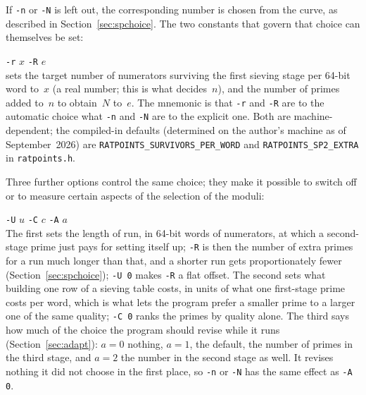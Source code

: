 \documentclass[12pt,a4paper,oneside]{amsart}
\begin{document}
If \verb+-n+ or \verb+-N+ is left out, the corresponding number is chosen
from the curve, as described in Section~\ref{sec:spchoice}. The two constants
that govern that choice can themselves be set: \\
\strut\quad\verb+-r+ $x$ \verb+-R+ $e$ \\
sets the target number of numerators surviving the first sieving stage per
64-bit word to~$x$ (a real number; this is what decides~$n$), and the number
of primes added to~$n$ to obtain~$N$ to~$e$. The mnemonic is that \verb+-r+ and
\verb+-R+ are to the automatic choice what \verb+-n+ and \verb+-N+ are to
the explicit one. Both are machine-dependent; the compiled-in defaults
(determined on the author's machine as of September~2026)
are \texttt{RATPOINTS\_SURVIVORS\_PER\_WORD}
and \texttt{RATPOINTS\_SP2\_EXTRA} in \texttt{ratpoints.h}.

Three further options control the same choice; they make it possible to
switch off or to measure certain aspects of the selection of the moduli: \\
\strut\quad\verb+-U+ $u$ \quad\verb+-C+ $c$ \quad\verb+-A+ $a$ \\
The first sets the length of run, in 64-bit words of numerators, at which a
second-stage prime just pays for setting itself up; \verb+-R+ is then the
number of extra primes for a run much longer than that, and a shorter run
gets proportionately fewer (Section~\ref{sec:spchoice}); \verb+-U 0+ makes
\verb+-R+ a flat offset. The second sets what building one row of a sieving
table costs, in units of what one first-stage prime costs per word, which
is what lets the program prefer a smaller prime to a larger one of the same
quality; \verb+-C 0+ ranks the primes by quality alone. The third says how
much of the choice the program should revise while it runs
(Section~\ref{sec:adapt}): $a = 0$ nothing, $a = 1$, the default, the
number of primes in the third stage, and $a = 2$ the number in the second
stage as well. It revises nothing it did not choose in the first place, so
\verb+-n+ or \verb+-N+ has the same effect as \verb+-A 0+.
\end{document}
